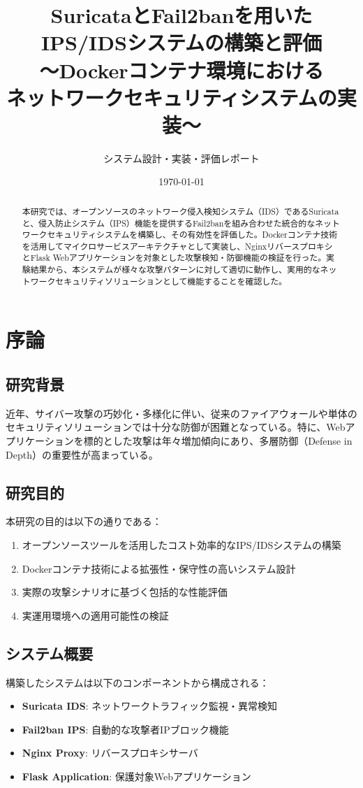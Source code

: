 \documentclass[12pt,a4paper]{article}
\title{
    \textbf{SuricataとFail2banを用いた\\
    IPS/IDSシステムの構築と評価} \\
    \large{～Dockerコンテナ環境における\\
    ネットワークセキュリティシステムの実装～}
}
\author{
    システム設計・実装・評価レポート
}
\date{\today}
\begin{document}
\maketitle

\begin{abstract}
本研究では、オープンソースのネットワーク侵入検知システム（IDS）であるSuricataと、侵入防止システム（IPS）機能を提供するFail2banを組み合わせた統合的なネットワークセキュリティシステムを構築し、その有効性を評価した。Dockerコンテナ技術を活用してマイクロサービスアーキテクチャとして実装し、NginxリバースプロキシとFlask Webアプリケーションを対象とした攻撃検知・防御機能の検証を行った。実験結果から、本システムが様々な攻撃パターンに対して適切に動作し、実用的なネットワークセキュリティソリューションとして機能することを確認した。
\end{abstract}

\section{序論}

\subsection{研究背景}
近年、サイバー攻撃の巧妙化・多様化に伴い、従来のファイアウォールや単体のセキュリティソリューションでは十分な防御が困難となっている。特に、Webアプリケーションを標的とした攻撃は年々増加傾向にあり、多層防御（Defense in Depth）の重要性が高まっている。

\subsection{研究目的}
本研究の目的は以下の通りである：
\begin{enumerate}
    \item オープンソースツールを活用したコスト効率的なIPS/IDSシステムの構築
    \item Dockerコンテナ技術による拡張性・保守性の高いシステム設計
    \item 実際の攻撃シナリオに基づく包括的な性能評価
    \item 実運用環境への適用可能性の検証
\end{enumerate}

\subsection{システム概要}
構築したシステムは以下のコンポーネントから構成される：
\begin{itemize}
    \item \textbf{Suricata IDS}: ネットワークトラフィック監視・異常検知
    \item \textbf{Fail2ban IPS}: 自動的な攻撃者IPブロック機能
    \item \textbf{Nginx Proxy}: リバースプロキシサーバ
    \item \textbf{Flask Application}: 保護対象Webアプリケーション
\end{itemize}
\end{document}
